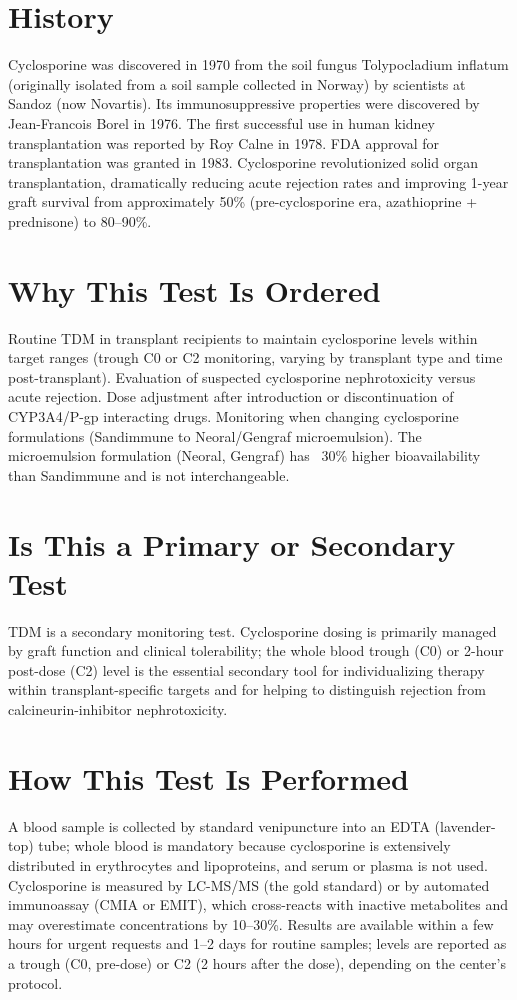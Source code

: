 \section*{History}
Cyclosporine was discovered in 1970 from the soil fungus Tolypocladium inflatum (originally isolated from a soil sample collected in Norway) by scientists at Sandoz (now Novartis). Its immunosuppressive properties were discovered by Jean-Francois Borel in 1976. The first successful use in human kidney transplantation was reported by Roy Calne in 1978. FDA approval for transplantation was granted in 1983. Cyclosporine revolutionized solid organ transplantation, dramatically reducing acute rejection rates and improving 1-year graft survival from approximately 50\% (pre-cyclosporine era, azathioprine + prednisone) to 80--90\%.

\section*{Why This Test Is Ordered}
Routine TDM in transplant recipients to maintain cyclosporine levels within target ranges (trough C0 or C2 monitoring, varying by transplant type and time post-transplant). Evaluation of suspected cyclosporine nephrotoxicity versus acute rejection. Dose adjustment after introduction or discontinuation of CYP3A4/P-gp interacting drugs. Monitoring when changing cyclosporine formulations (Sandimmune to Neoral/Gengraf microemulsion). The microemulsion formulation (Neoral, Gengraf) has ~30\% higher bioavailability than Sandimmune and is not interchangeable.

\section*{Is This a Primary or Secondary Test}
TDM is a secondary monitoring test. Cyclosporine dosing is primarily managed by graft function and clinical tolerability; the whole blood trough (C0) or 2-hour post-dose (C2) level is the essential secondary tool for individualizing therapy within transplant-specific targets and for helping to distinguish rejection from calcineurin-inhibitor nephrotoxicity.

\section*{How This Test Is Performed}
A blood sample is collected by standard venipuncture into an EDTA (lavender-top) tube; whole blood is mandatory because cyclosporine is extensively distributed in erythrocytes and lipoproteins, and serum or plasma is not used. Cyclosporine is measured by LC-MS/MS (the gold standard) or by automated immunoassay (CMIA or EMIT), which cross-reacts with inactive metabolites and may overestimate concentrations by 10--30\%. Results are available within a few hours for urgent requests and 1--2 days for routine samples; levels are reported as a trough (C0, pre-dose) or C2 (2 hours after the dose), depending on the center's protocol.

